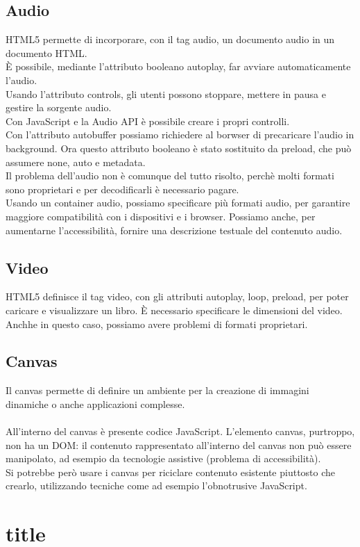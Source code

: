 \documentclass{article}
\begin{document}
\subsection{Audio}
HTML5 permette di incorporare, con il tag audio, un documento audio in un documento HTML. \\
È possibile, mediante l'attributo booleano autoplay, far avviare automaticamente l'audio.\\
Usando l'attributo controls, gli utenti possono stoppare, mettere in pausa e gestire la sorgente audio.\\
Con JavaScript e la Audio API è possibile creare i propri controlli.\\
Con l'attributo autobuffer possiamo richiedere al borwser di precaricare l'audio in background. Ora questo attributo booleano è stato sostituito da preload, che può assumere none, auto e metadata.\\
Il problema dell'audio non è comunque del tutto risolto, perchè molti formati sono proprietari e per decodificarli è necessario pagare.\\
Usando un container audio, possiamo specificare più formati audio, per garantire maggiore compatibilità con i dispositivi e i browser. Possiamo anche, per aumentarne l'accessibilità, fornire una descrizione testuale del contenuto audio.
\subsection{Video}
HTML5 definisce il tag video, con gli attributi autoplay, loop, preload, per poter caricare e visualizzare un libro. È necessario specificare le dimensioni del video. Anchhe in questo caso, possiamo avere problemi di formati proprietari.
\subsection{Canvas}
Il canvas permette di definire un ambiente per la creazione di immagini dinamiche o anche applicazioni complesse.\\\\
All'interno del canvas è presente codice JavaScript.
L'elemento canvas, purtroppo, non ha un DOM: il contenuto rappresentato all'interno del canvas non può essere manipolato, ad esempio da tecnologie assistive (problema di accessibilità).\\
Si potrebbe però usare i canvas per riciclare contenuto esistente piuttosto che crearlo, utilizzando tecniche come ad esempio l'obnotrusive JavaScript.
\section{title}
\end{document}
